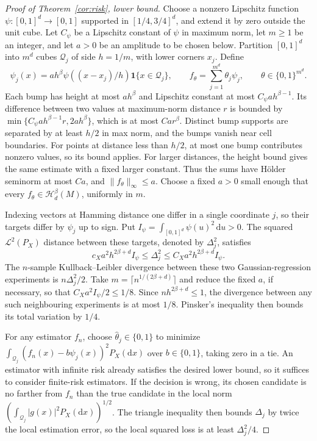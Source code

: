 \documentclass[11pt,a4paper]{article}
\theoremstyle{remark}
\newcommand{\Hcal}{\mathcal H}
\newcommand{\Lcal}{\mathcal L}
\newcommand{\norm}[1]{\lVert#1\rVert}
\begin{document}
\begingroup
\begin{proof}[Proof of Theorem~\ref{cor:risk}, lower bound]
Choose a nonzero Lipschitz function
$\psi:[0,1]^d\to[0,1]$ supported in $[1/4,3/4]^d$,
and extend it by zero outside the unit cube. Let $C_\psi$ be a
Lipschitz constant of $\psi$ in maximum norm, let $m\geq1$ be an
integer, and let $a>0$ be an amplitude to be chosen below.
Partition $[0,1]^d$ into $m^d$ cubes $\mathcal Q_j$ of side
$h=1/m$, with lower corners $x_j$. Define
\[
\psi_j(x)=a h^\beta\psi((x-x_j)/h)
\mathbf1\{x\in\mathcal Q_j\},\qquad
f_\theta=\sum_{j=1}^{m^d}\theta_j\psi_j,
\qquad\theta\in\{0,1\}^{m^d}.
\]
Each bump has height at most $ah^\beta$ and Lipschitz constant
at most $C_\psi ah^{\beta-1}$.
Its difference between two values at maximum-norm distance $r$ is bounded by
$\min\{C_\psi ah^{\beta-1}r,2ah^\beta\}$, which is at most
$C a r^\beta$. Distinct bump supports are separated by at least
$h/2$ in max norm, and the bumps vanish near cell boundaries.
For points at distance less than $h/2$, at most one bump contributes
nonzero values, so its bound applies. For larger distances, the
height bound gives the same estimate with a fixed larger constant.
Thus the sums have H\"older seminorm at most $Ca$, and
$\norm{f_\theta}_\infty\leq a$.
Choose a fixed $a>0$ small enough that every
$f_\theta\in\Hcal_d^\beta(M)$, uniformly in $m$.

Indexing vectors at Hamming distance one differ in a single
coordinate $j$, so their targets differ by $\psi_j$ up to sign.
Put $I_\psi=\int_{[0,1]^d}\psi(u)^2\,\mathrm d u>0$.
The squared $\Lcal^2(P_X)$ distance between these targets, denoted by $\Delta_j^2$,
satisfies
\[
c_Xa^2h^{2\beta+d}I_\psi\leq\Delta_j^2
\leq C_Xa^2h^{2\beta+d}I_\psi.
\]
The $n$-sample Kullback--Leibler divergence between these two
Gaussian-regression experiments is $n\Delta_j^2/2$.
Take $m=\lceil n^{1/(2\beta+d)}\rceil$ and reduce the fixed $a$,
if necessary, so that $C_Xa^2I_\psi/2\leq1/8$.
Since $nh^{2\beta+d}\leq1$, the divergence between any such
neighbouring experiments is at most
$1/8$. Pinsker's inequality then bounds its total variation by $1/4$.

For any estimator $f_n$, choose $\widehat\theta_j\in\{0,1\}$ to
minimize
$\int_{\mathcal Q_j}(f_n(x)-b\psi_j(x))^2P_X(\mathrm d x)$
over $b\in\{0,1\}$, taking zero in a tie.
An estimator with infinite risk already satisfies the desired lower
bound, so it suffices to consider finite-risk estimators.
If the decision is wrong, its chosen candidate is no farther from
$f_n$ than the true candidate in the local norm
$(\int_{\mathcal Q_j}|g(x)|^2P_X(\mathrm d x))^{1/2}$.
The triangle inequality then bounds $\Delta_j$ by twice the local
estimation error, so the local squared loss is at least
$\Delta_j^2/4$.


\end{proof}
\end{document}
